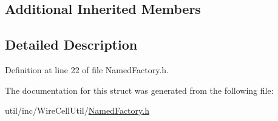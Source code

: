 \subsection*{Additional Inherited Members}


\subsection{Detailed Description}


Definition at line 22 of file Named\+Factory.\+h.



The documentation for this struct was generated from the following file\+:\begin{DoxyCompactItemize}
\item 
util/inc/\+Wire\+Cell\+Util/\hyperlink{_named_factory_8h}{Named\+Factory.\+h}\end{DoxyCompactItemize}
